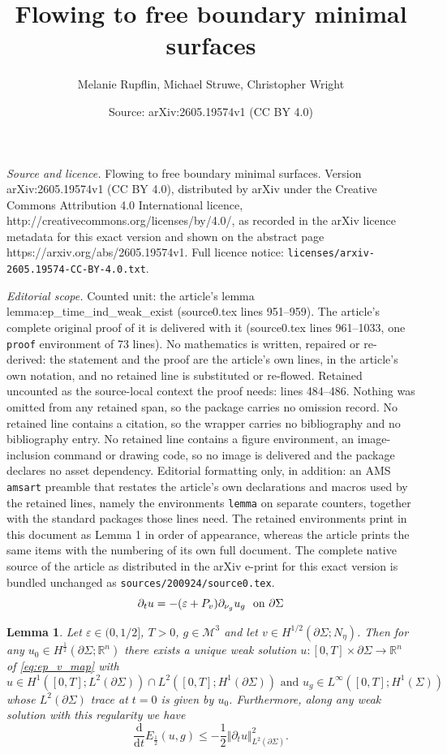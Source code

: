 \documentclass[10pt,a4paper]{amsart}
\title{\sc Flowing to free boundary minimal surfaces}
\author{Melanie Rupflin, Michael Struwe, Christopher Wright}
\date{Source: arXiv:2605.19574v1 (CC BY 4.0)}
\newtheorem{lemma}{Lemma}
\newcommand{\MM}{\mathcal{M}} %
\newcommand{\R}{\ensuremath{{\mathbb R}}}
\newcommand{\Si}{\Sigma}
\newcommand{\beq}{\begin{equation}}
\newcommand{\dd}{\mathrm{d}} %
\newcommand{\eeq}{\end{equation}}
\newcommand{\ep}{\varepsilon}
\newcommand{\half}{\frac{1}{2}}
\newcommand{\hf}{\frac{1}{2}} %
\newcommand{\norm}[1]{\Vert#1\Vert}
\newcommand{\p}{\partial} %
\newcommand{\pSi}{{\partial \Sigma}}
\begin{document}
\maketitle

\noindent\emph{Source and licence.} \sc Flowing to free boundary minimal surfaces. Version arXiv:2605.19574v1 (CC BY 4.0), distributed by arXiv under the Creative Commons Attribution 4.0 International licence, http://creativecommons.org/licenses/by/4.0/, as recorded in the arXiv licence metadata for this exact version and shown on the abstract page https://arxiv.org/abs/2605.19574v1. Full licence notice: \texttt{licenses/arxiv-2605.19574-CC-BY-4.0.txt}.\par\smallskip

\noindent\textit{Editorial scope.} Counted unit: the article's lemma lemma:ep\_time\_ind\_weak\_exist (source0.tex lines 951--959). The article's complete original proof of it is delivered with it (source0.tex lines 961--1033, one \texttt{proof} environment of 73 lines). No mathematics is written, repaired or re-derived: the statement and the proof are the article's own lines, in the article's own notation, and no retained line is substituted or re-flowed.  Retained uncounted as the source-local context the proof needs: lines 484--486.  Nothing was omitted from any retained span, so the package carries no omission record.  No retained line contains a citation, so the wrapper carries no bibliography and no bibliography entry.  No retained line contains a figure environment, an image-inclusion command or drawing code, so no image is delivered and the package declares no asset dependency.  Editorial formatting only, in addition: an AMS \texttt{amsart} preamble that restates the article's own declarations and macros used by the retained lines, namely the environments \texttt{lemma} on separate counters, together with the standard packages those lines need.  The retained environments print in this document as Lemma 1 in order of appearance, whereas the article prints the same items with the numbering of its own full document.  The complete native source of the article as distributed in the arXiv e-print for this exact version is bundled unchanged as \texttt{sources/200924/source0.tex}.
\begin{equation}\label{eq:ep_v_map}
	\p_t u = -(\ep + P_{v})\p_{\nu_{g}}u_{g}\ \hbox{ on }\pSi
\end{equation}

\begin{lemma}\label{lemma:ep_time_ind_weak_exist}
    Let $\ep\in (0, 1/2]$, $T>0$,  $g\in\MM^{3}$ and let $v\in H^{1/2}(\pSi;N_\eta)$. Then for any $u_0 \in  H^{\hf}(\p\Si;\R^n)$ there exists a unique weak solution $u:[0,T]\times \pSi\to \R^n$ of \eqref{eq:ep_v_map} with 
    $$u\in H^1([0,T];L^2(\p\Si))\cap L^2([0,T];H^1(\p\Si)) \text{ and } u_g\in  L^\infty([0,T];H^1(\Si)) %
    $$
    whose $L^2(\pSi)$ trace at $t=0$ is given by $u_0$. Furthermore, along any weak solution with this regularity we have  
    \beq\label{eq:energy-dec_ep_approx}
        \frac{\dd}{\dd t}E_\half(u,g)\leq -\half\norm{\p_tu}_{L^2(\p\Si)}^2.
    \eeq
\end{lemma}
\end{document}

